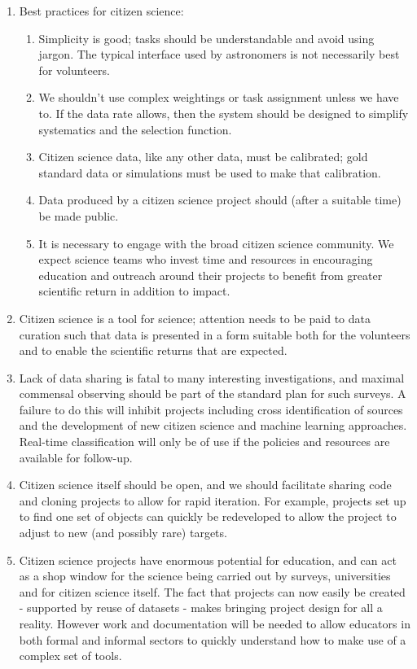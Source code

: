 \documentclass{pasa}
\begin{document}
\begin{enumerate}
\item Best practices for citizen science: 
\begin{enumerate}
\item Simplicity is good; tasks should be understandable and avoid using jargon. The typical interface used by astronomers is not necessarily best for volunteers. 
\item We shouldn't use complex weightings or task assignment unless we have to. If the data rate allows, then the system should be designed to simplify systematics and the selection function. 
\item Citizen science data, like any other data, must be calibrated; gold standard data or simulations must be used to make that calibration.
\item Data produced by a citizen science project should (after a suitable time) be made public. %
\item It is necessary to engage with the broad citizen science community. We expect science teams who invest time and resources in encouraging education and outreach around their projects to benefit from greater scientific return in addition to impact. 
\end{enumerate}

\item Citizen science is a tool for science; attention needs to be paid to data curation such that data is presented in a form suitable both for the volunteers and to enable the scientific returns that are expected. 
	
\item Lack of data sharing is fatal to many interesting investigations, and maximal commensal observing should be part of the standard plan for such surveys. A failure to do this will inhibit projects including cross identification of sources and the development of new citizen science and machine learning approaches. Real-time classification will only be of use if the policies and resources are available for follow-up. 

\item Citizen science itself should be open, and we should facilitate sharing code and cloning projects to allow for rapid iteration. For example, projects set up to find one set of objects can quickly be redeveloped to allow the project to adjust to new (and possibly rare) targets.

\item Citizen science projects have enormous potential for education, and can act as a shop window for the science being carried out by surveys, universities and for citizen science itself. The fact that projects can now easily be created - supported by reuse of datasets - makes bringing project design for all a reality. However work and documentation will be needed to allow educators in both formal and informal sectors to quickly understand how to make use of a complex set of tools. 

\end{enumerate} 
\end{document}

